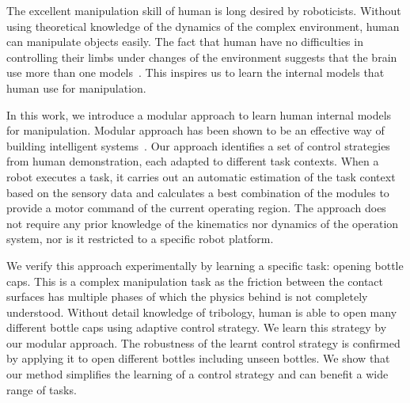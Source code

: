 \documentclass[preprint,12pt]{elsarticle}
\begin{document}


The excellent manipulation skill of human is long desired by roboticists. Without using theoretical knowledge of the dynamics of the complex environment, human can manipulate objects easily. The fact that human have no difficulties in controlling their limbs under changes of the environment suggests that the brain use more than one models~\cite{haruno2001mosaic}. This inspires us to learn the internal models that human use for manipulation.

In this work, we introduce a modular approach to learn human internal models for manipulation. Modular approach has been shown to be an effective way of building intelligent systems~\cite{bryson2004modular,BrysonMcG12}. Our approach identifies a set of control strategies from human demonstration, each adapted to different task contexts. When a robot executes a task, it carries out an automatic estimation of the task context based on the sensory data and calculates a best combination of the modules to provide a motor command of the current operating region. The approach does not require any prior knowledge of the kinematics nor dynamics of the operation system, nor is it restricted to a specific robot platform. %

We verify this approach experimentally by learning a specific task: opening bottle caps. This is a complex manipulation task as the friction between the contact surfaces has multiple phases of which the physics behind is not completely understood. Without detail knowledge of tribology, human is able to open many different bottle caps using adaptive control strategy. We learn this strategy by our modular approach. The robustness of the learnt control strategy is confirmed by applying it to open different bottles including unseen bottles. We show that our method simplifies the learning of a control strategy and can benefit a wide range of tasks.
\end{document}
